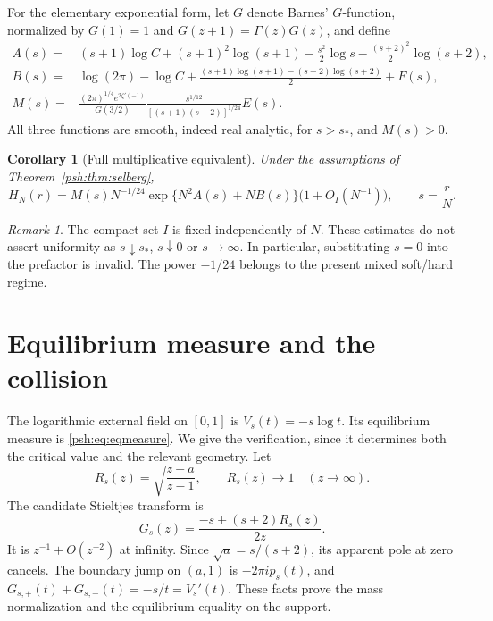 \documentclass[11pt,a4paper]{article}
\numberwithin{equation}{section}
\newtheorem{corollary}[theorem]{Corollary}
\theoremstyle{remark}\newtheorem{remark}[theorem]{Remark}
\begin{document}
For the elementary exponential form, let $G$ denote Barnes' $G$-function,
normalized by $G(1)=1$ and $G(z+1)=\Gamma(z)G(z)$, and define
\begin{align}
 A(s)={}&(s+1)\log C+(s+1)^2\log(s+1)
       -\frac{s^2}{2}\log s-\frac{(s+2)^2}{2}\log(s+2),\label{psh:eq:A}\\
 B(s)={}&\log(2\pi)-\log C
       +\frac{(s+1)\log(s+1)-(s+2)\log(s+2)}2+F(s),\label{psh:eq:B}\\
 M(s)={}&\frac{(2\pi)^{1/4}e^{2\zeta'(-1)}}{G(3/2)}
       \frac{s^{1/12}}{[(s+1)(s+2)]^{1/24}} E(s).
       \label{psh:eq:M}
\end{align}
All three functions are smooth, indeed real analytic, for $s>s_*$, and
$M(s)>0$.

\begin{corollary}[Full multiplicative equivalent]\label{psh:cor:full}
Under the assumptions of Theorem~\ref{psh:thm:selberg},
\begin{equation}\label{psh:eq:full}
 H_N(r)=M(s)N^{-1/24}\exp\{N^2 A(s)+N B(s)\}
          \bigl(1+O_I(N^{-1})\bigr),\qquad s=\frac rN.
\end{equation}
\end{corollary}
\begin{remark}
The compact set $I$ is fixed independently of $N$. These estimates do not
assert uniformity as $s\downarrow s_*$, $s\downarrow0$ or $s\to\infty$.
In particular, substituting $s=0$ into the prefactor is invalid. The
power $-1/24$ belongs to the present mixed soft/hard regime.
\end{remark}

\section{Equilibrium measure and the collision}\label{psh:sec:equilibrium}
The logarithmic external field on $[0,1]$ is $V_s(t)=-s\log t$.
Its equilibrium measure is \eqref{psh:eq:eqmeasure}. We give the verification,
since it determines both the critical value and the relevant geometry.
Let
\[
 R_s(z)=\sqrt{\frac{z-a}{z-1}},\qquad R_s(z)\to1\quad(z\to\infty).
\]
The candidate Stieltjes transform is
\begin{equation}\label{psh:eq:resolvent}
 G_s(z)=\frac{-s+(s+2)R_s(z)}{2z}.
\end{equation}
It is $z^{-1}+O(z^{-2})$ at infinity. Since
$\sqrt a=s/(s+2)$, its apparent pole at zero cancels. The boundary jump on
$(a,1)$ is $-2\pi i p_s(t)$, and
$G_{s,+}(t)+G_{s,-}(t)=-s/t=V_s'(t)$. These facts prove the mass
normalization and the equilibrium equality on the support.
\end{document}
